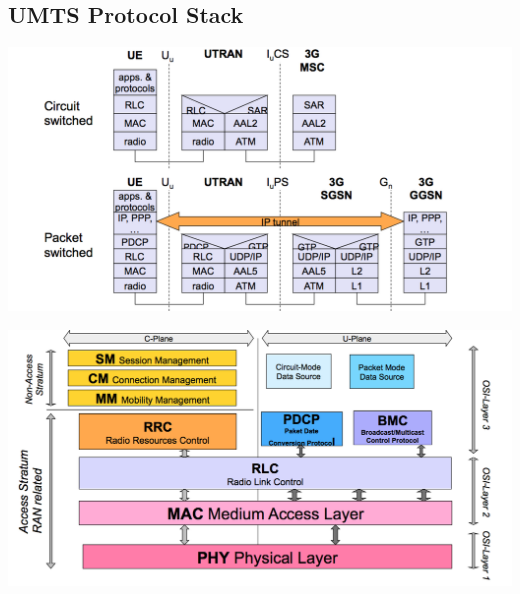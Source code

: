 \subsection{UMTS Protocol Stack}
\begin{minipage}{0.5\linewidth}
\includegraphics[width = \linewidth]{./Pics/UMTSArch6}
\end{minipage}
\begin{minipage}{0.5\linewidth}
\includegraphics[width = \linewidth]{./Pics/UMTSStack}
\end{minipage}

